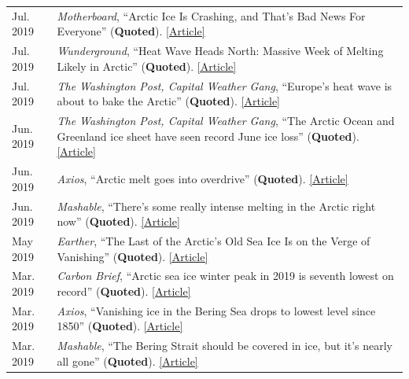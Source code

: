 \documentclass[margin,line,palatino,courier,10pt]{res}
\begin{document}
\begin{resume}
\begin{tabular}{@{}p{0.9in}p{4in}}
Jul. 2019 & \textit{Motherboard}, ``Arctic Ice Is Crashing, and That's Bad News For Everyone'' (\textbf{Quoted}). \href{https://www.vice.com/en_us/article/qv7gzm/arctic-ice-is-crashing-and-thats-bad-news-for-everyone}{[Article]}\\
Jul. 2019 & \textit{Wunderground}, ``Heat Wave Heads North: Massive Week of Melting Likely in Arctic'' (\textbf{Quoted}). \href{https://www.wunderground.com/cat6/Heat-Wave-Heads-North-Massive-Week-Melting-Likely-Arctic}{[Article]}\\
Jul. 2019 & \textit{The Washington Post, Capital Weather Gang}, ``Europe's heat wave is about to bake the Arctic'' (\textbf{Quoted}). \href{https://www.washingtonpost.com/weather/2019/07/26/europes-heat-wave-is-about-bake-arctic/?utm_term=.f57032deb299}{[Article]}\\
Jun. 2019 & \textit{The Washington Post, Capital Weather Gang}, ``The Arctic Ocean and Greenland ice sheet have seen record June ice loss'' (\textbf{Quoted}). \href{https://www.washingtonpost.com/weather/2019/06/14/arctic-ocean-greenland-ice-sheet-have-seen-record-june-ice-loss/?utm_term=.7539db99ca6e}{[Article]}\\
Jun. 2019 & \textit{Axios}, ``Arctic melt goes into overdrive'' (\textbf{Quoted}). \href{https://www.axios.com/newsletters/axios-science-9172185b-a9a1-498f-9014-4ee04e1ff826.html?chunk=3#story3}{[Article]}\\
Jun. 2019 & \textit{Mashable}, ``There's some really intense melting in the Arctic right now'' (\textbf{Quoted}). \href{https://mashable.com/article/arctic-melting-records/}{[Article]}\\
May 2019 & \textit{Earther}, ``The Last of the Arctic's Old Sea Ice Is on the Verge of Vanishing'' (\textbf{Quoted}). \href{https://earther.gizmodo.com/the-last-of-the-arctics-old-sea-ice-is-on-the-verge-of-1834510753}{[Article]}\\
Mar. 2019 & \textit{Carbon Brief}, ``Arctic sea ice winter peak in 2019 is seventh lowest on record'' (\textbf{Quoted}). \href{https://www.carbonbrief.org/arctic-sea-ice-winter-peak-in-2019-is-seventh-lowest-on-record}{[Article]}\\
Mar. 2019 & \textit{Axios}, ``Vanishing ice in the Bering Sea drops to lowest level since 1850'' (\textbf{Quoted}). \href{https://www.axios.com/bering-sea-ice-vanishing-a23bacda-a08d-4ec7-9124-419b90b984a2.html}{[Article]}\\
Mar. 2019 &\textit{Mashable}, ``The Bering Strait should be covered in ice, but it's nearly all gone'' (\textbf{Quoted}). \href{https://mashable.com/article/bering-strait-sea-ice-gone-2019-arctic/#zs3hdvbg3mqc}{[Article]}\\

\end{tabular}
\end{resume}
\end{document}
